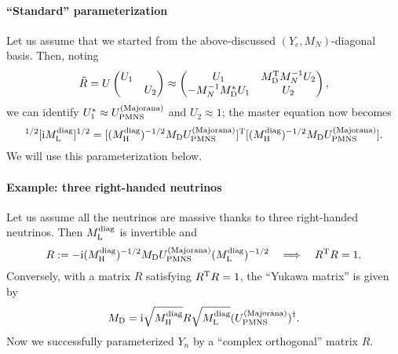 \documentclass[CheatSheet]{subfiles}
\newcommand\MD[1][]{M_{\mathrm{D}#1}}
\newcommand\MN[1][]{M_{N#1}}
\begin{document}
\paragraph{``Standard'' parameterization}
Let us assume that we started from the above-discussed $(Y_e,\MN)$-diagonal basis.
Then, noting
\begin{equation}
 \tilde R=U\pmat{U_1\\&U_2}\approx \pmat{U_1 & \MD^\TT\MN^{-1}U_2 \\ -\MN^{-1}\MD^* U_1 & U_2},
\end{equation}
we can identify $U_1^*\approx U^{\text{(Majorana)}}_{\mathrm{PMNS}}$ and $U_2\approx 1$; the master equation now becomes
\begin{equation}
 [\ii M\w L\wdiag]^{1/2}[\ii M\w L\wdiag]^{1/2} =
[(M\w H\wdiag)^{-1/2}\MD U^{\text{(Majorana)}}\w{PMNS}]^\TT
[(M\w H\wdiag)^{-1/2}\MD U^{\text{(Majorana)}}\w{PMNS}].
\end{equation}
We will use this parameterization below.

\paragraph{Example: three right-handed neutrinos}
Let us assume all the neutrinos are massive thanks to three right-handed neutrinos. Then $M_{\mathrm{L}}^{\text{diag}}$ is invertible and
\begin{equation}
 R:=-\ii (M\w H\wdiag)^{-1/2}\MD  U^{\text{(Majorana)}}\w{PMNS}  (M\w L^\text{diag})^{-1/2}
\quad\Longrightarrow\quad R^\TT R=1.
\end{equation}
Conversely, with a matrix $R$ satisfying $R^{\mathrm{T}} R=1$, the ``Yukawa matrix'' is given by
\begin{equation}
 \MD = \ii \sqrt{M\w H^\text{diag}}R\sqrt{M\w L^\text{diag}}(U^{\text{(Majorana)}}\w{PMNS} )^\dagger.
\end{equation}
Now we successfully parameterized $Y_n$ by a ``complex orthogonal'' matrix $R$.
\end{document}
